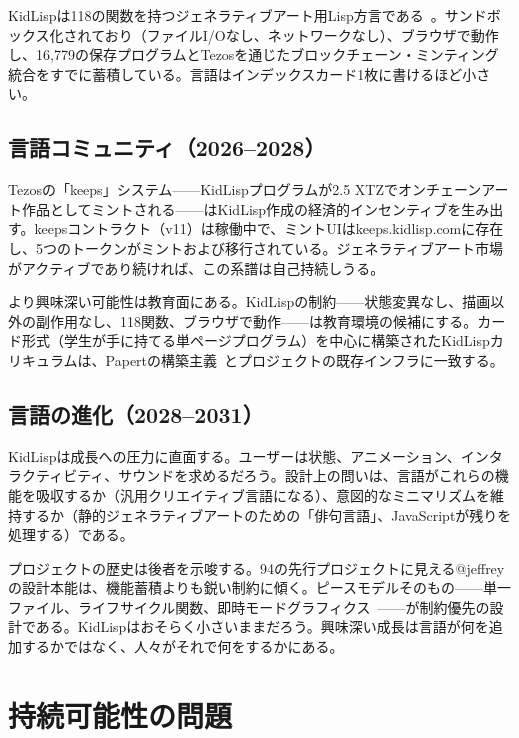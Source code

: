 \documentclass[10pt,letterpaper,twocolumn]{article}
\begin{document}
KidLispは118の関数を持つジェネラティブアート用Lisp方言である~\citep{scudder2026kidlisp}。サンドボックス化されており（ファイルI/Oなし、ネットワークなし）、ブラウザで動作し、16,779の保存プログラムとTezosを通じたブロックチェーン・ミンティング統合をすでに蓄積している。言語はインデックスカード1枚に書けるほど小さい。

\subsection{言語コミュニティ（2026--2028）}

Tezosの「keeps」システム——KidLispプログラムが2.5 XTZでオンチェーンアート作品としてミントされる——はKidLisp作成の経済的インセンティブを生み出す。keepsコントラクト（v11）は稼働中で、ミントUIはkeeps.kidlisp.comに存在し、5つのトークンがミントおよび移行されている。ジェネラティブアート市場がアクティブであり続ければ、この系譜は自己持続しうる。

より興味深い可能性は教育面にある。KidLispの制約——状態変異なし、描画以外の副作用なし、118関数、ブラウザで動作——は教育環境の候補にする。カード形式（学生が手に持てる単ページプログラム）を中心に構築されたKidLispカリキュラムは、Papertの構築主義~\citep{papert1980mindstorms}とプロジェクトの既存インフラに一致する。

\subsection{言語の進化（2028--2031）}

KidLispは成長への圧力に直面する。ユーザーは状態、アニメーション、インタラクティビティ、サウンドを求めるだろう。設計上の問いは、言語がこれらの機能を吸収するか（汎用クリエイティブ言語になる）、意図的なミニマリズムを維持するか（静的ジェネラティブアートのための「俳句言語」、JavaScriptが残りを処理する）である。

プロジェクトの歴史は後者を示唆する。94の先行プロジェクトに見える@jeffreyの設計本能は、機能蓄積よりも鋭い制約に傾く。ピースモデルそのもの——単一ファイル、ライフサイクル関数、即時モードグラフィクス~\citep{scudder2026pieces}——が制約優先の設計である。KidLispはおそらく小さいままだろう。興味深い成長は言語が何を追加するかではなく、人々がそれで何をするかにある。


\section{持続可能性の問題}
\label{sec:sustainability}
\end{document}
